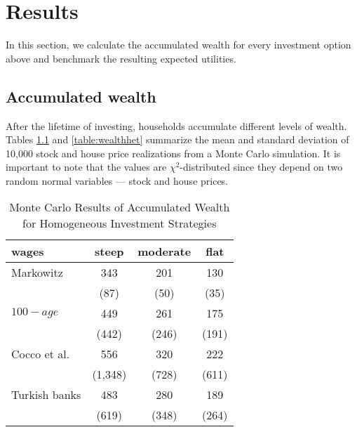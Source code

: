 \chapter{Results}
\label{welfare}

In this section, we calculate the accumulated wealth for every investment option above and benchmark the resulting expected utilities.

\section{Accumulated wealth}

After the lifetime of investing, households accumulate different levels of wealth. Tables \ref{table:wealthhom} and \ref{table:wealthhet} summarize the mean and standard deviation of 10,000 stock and house price realizations from a Monte Carlo simulation. It is important to note that the values are $\chi^2$-distributed since they depend on two random normal variables --- stock and house prices.

\begin{table}[h!]
	\centering
	\caption{Monte Carlo Results of Accumulated Wealth for Homogeneous Investment Strategies}
	\label{table:wealthhom}
	\begin{tabular}[c]{|l|c|c|c|}
		\hline
		 wages& steep & moderate & flat\\
		\hline
Markowitz			&  343  &   201&   130\\
							& (87)  &  (50)&   (35)\\
$100-age$					&  449  &   261&  175\\  
							& (442) & (246)& (191)\\
Cocco et al.				&  556  &   320&  222\\  
							&(1,348)& (728)& (611)\\
Turkish banks			 	&  483  &   280&  189\\  
							&  (619)& (348)& (264)\\
	\hline
	\end{tabular}
\end{table}

